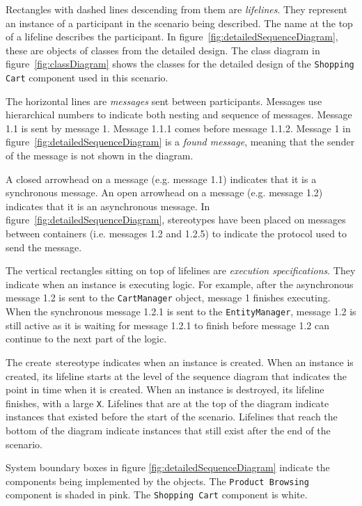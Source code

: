 Rectangles with dashed lines descending from them are \emph{lifelines}.
They represent an instance of a participant in the scenario being described.
The name at the top of a lifeline describes the participant.
In figure~\ref{fig:detailedSequenceDiagram}, these are objects of classes from the detailed design.
The class diagram in figure~\ref{fig:classDiagram} shows the classes for the detailed design of the \texttt{Shopping Cart} component used in this scenario.

The horizontal lines are \emph{messages} sent between participants.
Messages use hierarchical numbers to indicate both nesting and sequence of messages.
Message 1.1 is sent by message 1. Message 1.1.1 comes before message 1.1.2.
Message 1 in figure~\ref{fig:detailedSequenceDiagram} is a \emph{found message},
meaning that the sender of the message is not shown in the diagram.

A closed arrowhead on a message (e.g. message 1.1) indicates that it is a synchronous message.
An open arrowhead on a message (e.g. message 1.2) indicates that it is an asynchronous message.
In figure~\ref{fig:detailedSequenceDiagram}, stereotypes have been placed on messages between containers
(i.e. messages 1.2 and 1.2.5) to indicate the protocol used to send the message.

The vertical rectangles sitting on top of lifelines are \emph{execution specifications}.
They indicate when an instance is executing logic.
For example, after the asynchronous message 1.2 is sent to the \texttt{CartManager} object,
message 1 finishes executing.
When the synchronous message 1.2.1 is sent to the \texttt{EntityManager}, message 1.2 is still active
as it is waiting for message 1.2.1 to finish before message 1.2 can continue to the next part of the logic.

The \guillemotleft create\guillemotright~stereotype indicates when an instance is created.
When an instance is created, its lifeline starts at the level of the sequence diagram that indicates the point in time when it is created.
When an instance is destroyed, its lifeline finishes, with a large \texttt{X}.
Lifelines that are at the top of the diagram indicate instances that existed before the start of the scenario.
Lifelines that reach the bottom of the diagram indicate instances that still exist after the end of the scenario.

System boundary boxes in figure \ref{fig:detailedSequenceDiagram} indicate the components being implemented by the objects.
The \texttt{Product Browsing} component is shaded in pink.
The \texttt{Shopping Cart} component is white.

